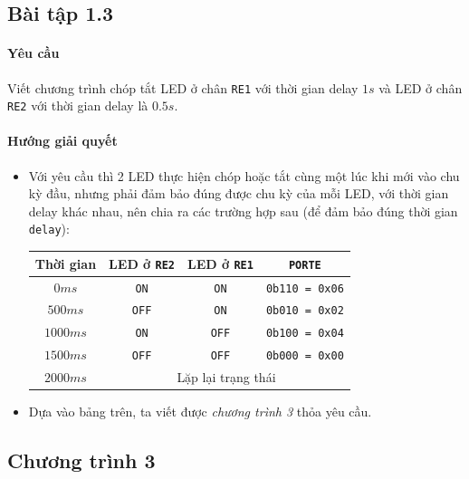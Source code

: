 \subsection{Bài tập 1.3}\label{Exe:1-3}
\paragraph{Yêu cầu}Viết chương trình chóp tắt LED ở chân \verb|RE1| với thời gian delay $1s$ và LED ở chân \verb|RE2| với thời gian delay là $0.5s$.
\paragraph{Hướng giải quyết}
\begin{itemize}
\item Với yêu cầu thì 2 LED thực hiện chóp hoặc tắt cùng một lúc khi mới vào chu kỳ đầu, nhưng phải đảm bảo đúng được chu kỳ của mỗi LED, với thời gian delay khác nhau, nên chia ra các trường hợp sau (để đảm bảo đúng thời gian \verb|delay|):
\begin{center}
\begin{tabular}{|c|c|c|c|}\hline
Thời gian & LED ở \verb|RE2| & LED ở \verb|RE1| & \verb|PORTE| \\ \hline
$0ms$ & \verb|ON| & \verb|ON| & \verb|0b110 = 0x06|\\ \hline
$500ms$ & \verb|OFF| & \verb|ON| & \verb|0b010 = 0x02|\\ \hline
$1000ms$ & \verb|ON| & \verb|OFF| & \verb|0b100 = 0x04| \\ \hline
$1500ms$ & \verb|OFF| & \verb|OFF| & \verb|0b000 = 0x00| \\ \hline
$2000ms$ & \multicolumn{3}{c|}{Lặp lại trạng thái}\\ \hline
\end{tabular}
\end{center}
\item Dựa vào bảng trên, ta viết được \emph{chương trình 3} thỏa yêu cầu.
\end{itemize}
\newpage
\subsection*{Chương trình 3}


